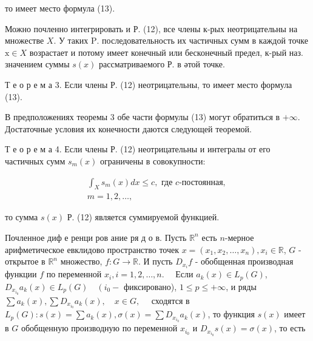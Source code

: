 \documentclass[10pt]{article}
\begin{document}
то имеет место формула (13).



Можно почленно интегрировать и Р. (12), все члены к-рых неотрицательны на множестве $X$. У таких $\mathrm{P}$. последовательность их частичных сумм в каждой точке $\mathrm{x} \in X$ возрастает и потому имеет конечный или бесконечный предел, к-рый наз. значением суммы $s(x)$ рассматриваемого Р. в әтой точке.



Т е о р е м а 3. Если члены Р. (12) неотрицательны, то имеет место формула (13).



В предположениях теоремы 3 обе части формулы (13) могут обратиться в $+\infty$. Достаточные условия их конечности даются следующей теоремой.



Т е о р е м а 4. Если члены Р. (12) неотрицательны и интегралы от его частичных сумм $s_{m}(x)$ ограничены в совокупности:



\[

\begin{gathered}

\int_{X} s_{m}(x) d x \leqslant c, \text { где } c \text {-постоянная, } \\

m=1,2, \ldots,

\end{gathered}

\]



то сумма $s(x)$ Р. (12) является суммируемой функцией.



Почленное диф е ренци ров ание ря д о в. Пусть $\mathbb{R}^{n}$ есть $n$-мерное арифметическое евклидово пространство точек $x=\left(x_{1}, x_{2}, \ldots, x_{n}\right), x_{i} \in \mathbb{R}$, $G$ - открытое в $\mathbb{R}^{n}$ множество, $f: G \rightarrow \mathbb{R}$. И пусть $D_{x_{i}} f$ - обобщенная производная функции $f$ по переменной $x_{i}, i=1,2, \ldots, n . \quad$ Если $a_{k}(x) \in L_{p}(G)$, $D_{x_{i_{0}}} a_{k}(x) \in L_{p}(G) \quad\left(i_{0}-\right.$ фиксировано), $1 \leqslant p \leqslant+\infty$, и ряды $\sum a_{k}(x), \sum D_{x_{i_{0}}} a_{k}(x), \quad x \in G, \quad$ сходятся в $L_{p}(G): s(x)=\sum a_{k}(x), \sigma(x)=\sum D_{x_{i_{0}}} a_{k}(x)$, то функция $s(x)$ имеет в $G$ обобщенную производную по переменной $x_{i_{0}}$ и $D_{x_{i_{0}}} s(x)=\sigma(x)$, то есть
\end{document}
